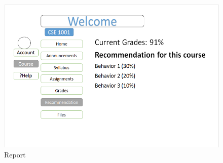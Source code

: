 \documentclass[12pt]{article}
\begin{document}
\begin{figure}
\caption{Report}
\includegraphics[width=\textwidth]{img/8} 
\end{figure}
\end{document}
